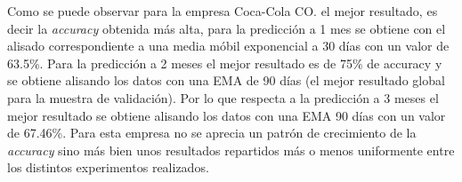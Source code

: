 \documentclass[]{article}
\begin{document}

\setlength\parskip{5ex}

Como se puede observar para la empresa Coca-Cola CO. el mejor resultado,
es decir la \emph{accuracy} obtenida más alta, para la predicción a 1
mes se obtiene con el alisado correspondiente a una media móbil
exponencial a 30 días con un valor de 63.5\%. Para la predicción a 2
meses el mejor resultado es de 75\% de accuracy y se obtiene alisando
los datos con una EMA de 90 días (el mejor resultado global para la
muestra de validación). Por lo que respecta a la predicción a 3 meses el
mejor resultado se obtiene alisando los datos con una EMA 90 días con un
valor de 67.46\%. Para esta empresa no se aprecia un patrón de
crecimiento de la \emph{accuracy} sino más bien unos resultados
repartidos más o menos uniformente entre los distintos experimentos
realizados.
\end{document}

